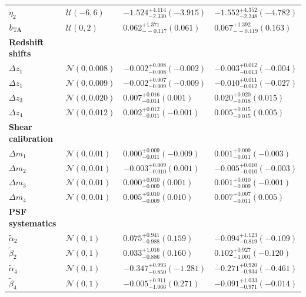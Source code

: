 {\begin{table}[ht]
\begin{tabular}{l | l | l | l }
$\eta_2$ & $\mathcal{U}(-6, 6)$ & $-1.524_{-2.330}^{+4.114} ({-3.915})$ & $-1.552_{-2.248}^{+4.352} ({-4.782})$ \\ 
$b_{\rm TA}$ & $\mathcal{U}(0, 2)$ & $0.062_{--0.117}^{+1.371} ({0.061})$ & $0.067_{--0.119}^{+1.392} ({0.163})$ \\ 
\hline
\textbf{Redshift shifts} & & & \\
$\Delta z_1$ & $\mathcal{N}(0, 0.008)$ & $-0.002_{-0.008}^{+0.008} ({-0.002})$ & $-0.003_{-0.013}^{+0.012} ({-0.004})$ \\ 
$\Delta z_1$ & $\mathcal{N}(0, 0.009)$ & $-0.002_{-0.009}^{+0.007} ({-0.009})$ & $-0.010_{-0.012}^{+0.011} ({-0.027})$ \\ 
$\Delta z_3$ & $\mathcal{N}(0, 0.020)$ & $0.007_{-0.014}^{+0.016} ({0.001})$ & $0.020_{-0.018}^{+0.020} ({0.015})$ \\ 
$\Delta z_4$ & $\mathcal{N}(0, 0.012)$ & $0.002_{-0.011}^{+0.012} ({-0.001})$ & $0.005_{-0.015}^{+0.015} ({0.005})$ \\ 
\hline
\textbf{Shear calibration} & & & \\
$\Delta m_1$ & $\mathcal{N}(0, 0.01)$ & $0.000_{-0.011}^{+0.009} ({-0.009})$ & $0.001_{-0.011}^{+0.009} ({-0.003})$ \\ 
$\Delta m_2$ & $\mathcal{N}(0, 0.01)$ & $-0.003_{-0.010}^{+0.009} ({0.001})$ & $-0.005_{-0.010}^{+0.010} ({-0.003})$ \\ 
$\Delta m_3$ & $\mathcal{N}(0, 0.01)$ & $0.000_{-0.009}^{+0.010} ({0.001})$ & $0.001_{-0.009}^{+0.010} ({-0.001})$ \\ 
$\Delta m_4$ & $\mathcal{N}(0, 0.01)$ & $0.005_{-0.009}^{+0.010} ({0.010})$ & $0.007_{-0.011}^{+0.007} ({0.005})$ \\
\hline
\textbf{PSF systematics} & & & \\
$\tilde{\alpha}_2$ & $\mathcal{N}(0, 1)$ & $0.075_{-0.988}^{+0.941} ({0.159})$ & $-0.094_{-0.819}^{+1.123} ({-0.109})$ \\
$\tilde{\beta}_2$ & $\mathcal{N}(0, 1)$ & $0.033_{-0.886}^{+1.016} ({0.160})$ & $0.102_{-1.001}^{+0.927} ({-0.120})$ \\ 
$\tilde{\alpha}_4$ & $\mathcal{N}(0, 1)$ & $-0.347_{-0.850}^{+0.993} ({-1.281})$ & $-0.271_{-0.934}^{+0.920} ({-0.461})$ \\ 
$\tilde{\beta}_4$ & $\mathcal{N}(0, 1)$ & $-0.005_{-1.066}^{+0.911} ({0.271})$ & $-0.091_{-0.971}^{+1.033} ({-0.014})$ \\  
\hline
\end{tabular}
\end{table}}

